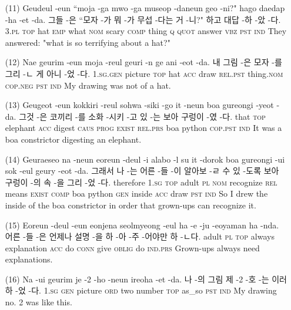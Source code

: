 \begin{itemize}
\item [(11)]
\tgl
		{Geudeul -eun ``moja -ga mwo -ga museop -daneun geo -ni?" hago daedap -ha -et -da.}
		{그들 -은 ``모자 -가 뭐 -가 무섭 -다는 거 -니?" 하고 대답 -하 -았 -다.}
		{\textsc{3.pl} \textsc{top} hat \textsc{emp} what \textsc{nom} scary \textsc{comp} thing \textsc{q} \textsc{quot} answer \textsc{vbz} \textsc{pst} \textsc{ind}}
		{They answered: "what is so terrifying about a hat?"}

\item [(12)]
\tgl
		{Nae geurim -eun moja -reul geuri -n ge ani -eot -da.}
		{내 그림 -은 모자 -를 그리 -ㄴ 게 아니 -었 -다.}
		{\textsc{1.sg.gen} picture \textsc{top} hat \textsc{acc} draw \textsc{rel.pst} thing.\textsc{nom} \textsc{cop.neg} \textsc{pst} \textsc{ind}}
		{My drawing was not of a hat.}

\item [(13)]
\tgl
		{Geugeot -eun kokkiri -reul sohwa -siki -go it -neun boa gureongi -yeot -da.}
		{그것 -은 코끼리 -를 소화 -시키 -고 있 -는 보아 구렁이 -였 -다.}
		{that \textsc{top} elephant \textsc{acc} digest \textsc{caus} \textsc{prog} \textsc{exist} \textsc{rel.prs} boa python \textsc{cop.pst} \textsc{ind}}
		{It was a boa constrictor digesting an elephant.}

\item [(14)]
\tgl
		{Geuraeseo na -neun eoreun -deul -i alabo -l su it -dorok boa gureongi -ui sok -eul geury -eot -da.}
		{그래서 나 -는 어른 -들 -이 알아보 -ㄹ 수 있 -도록 보아 구렁이 -의 속 -을 그리 -었 -다.}
		{therefore \textsc{1.sg} \textsc{top} adult \textsc{pl} \textsc{nom} recognize \textsc{rel} means \textsc{exist} \textsc{comp} boa python \textsc{gen} inside \textsc{acc} draw \textsc{pst} \textsc{ind}}
		{So I drew the inside of the boa constrictor in order that grown-ups can recognize it.}

\item [(15)]
\tgl
		{Eoreun -deul -eun eonjena seolmyeong -eul ha -e -ju -eoyaman ha -nda.}
		{어른 -들 -은 언제나 설명 -을 하 -아 -주 -어야만 하 -ㄴ다.}
		{adult \textsc{pl} \textsc{top} always explanation \textsc{acc} do \textsc{conn} give \textsc{oblig} do \textsc{ind.prs}}
		{Grown-ups always need explanations.}

\item [(16)]
\tgl
		{Na -ui geurim je -2 -ho -neun ireoha -et -da.}
		{나 -의 그림 제 -2 -호 -는 이러하 -었 -다.}
		{\textsc{1.sg} \textsc{gen} picture \textsc{ord} two number \textsc{top} as\_so \textsc{pst} \textsc{ind}}
		{My drawing no. 2 was like this.}


\end{itemize}
